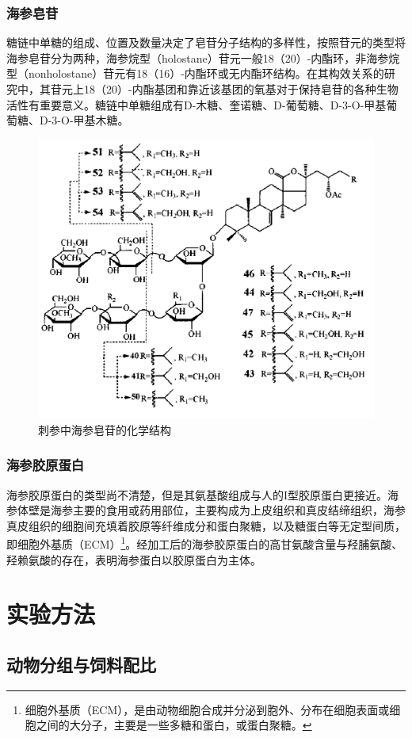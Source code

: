 \documentclass{QITthesis}
\begin{document}
\subsubsection{海参皂苷}

糖链中单糖的组成、位置及数量决定了皂苷分子结构的多样性，按照苷元的类型将海参皂苷分为两种，海参烷型（holostane）苷元一般18（20）-内酯环，非海参烷型（nonholostane）苷元有18（16）-内酯环或无内酯环结构。在其构效关系的研究中，其苷元上18（20）-内酯基团和靠近该基团的氧基对于保持皂苷的各种生物活性有重要意义。糖链中单糖组成有D-木糖、奎诺糖、D-葡萄糖、D-3-O-甲基葡萄糖、D-3-O-甲基木糖。

\begin{figure}[H]
    \centering
    \includegraphics[width=.5\textwidth]{example_figures/图片2.png}
    \caption{刺参中海参皂苷的化学结构}
\end{figure}

\subsubsection{海参胶原蛋白}

海参胶原蛋白的类型尚不清楚，但是其氨基酸组成与人的I型胶原蛋白更接近。海参体壁是海参主要的食用或药用部位，主要构成为上皮组织和真皮结缔组织，海参真皮组织的细胞间充填着胶原等纤维成分和蛋白聚糖，以及糖蛋白等无定型间质，即细胞外基质（ECM）\footnote{细胞外基质（ECM），是由动物细胞合成并分泌到胞外、分布在细胞表面或细胞之间的大分子，主要是一些多糖和蛋白，或蛋白聚糖。}。经加工后的海参胶原蛋白的高甘氨酸含量与羟脯氨酸、羟赖氨酸的存在，表明海参蛋白以胶原蛋白为主体。

\section{实验方法}
\subsection{动物分组与饲料配比}
\end{document}
